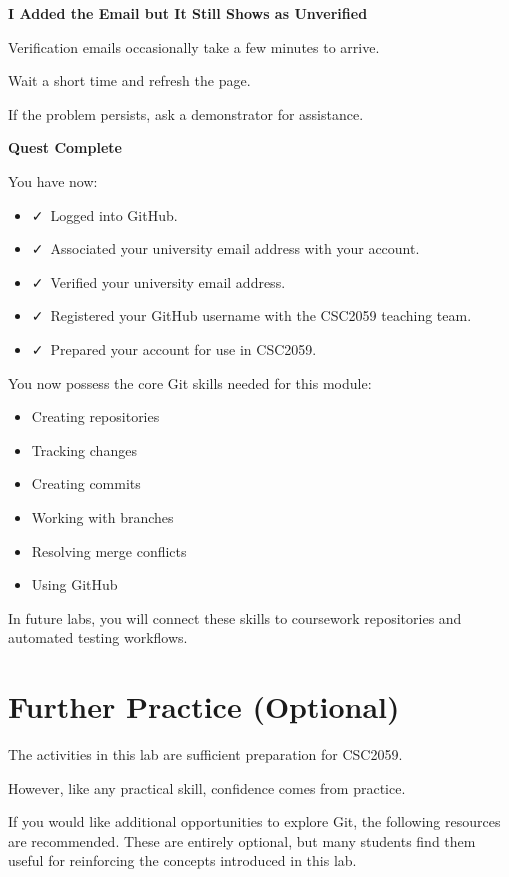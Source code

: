 \documentclass{csc2059practical}
\begin{document}
\begin{commonerror}
\textbf{I Added the Email but It Still Shows as Unverified}\par
\medskip
Verification emails occasionally take a few minutes to arrive.

Wait a short time and refresh the page.

If the problem persists, ask a demonstrator for assistance.
\end{commonerror}
\begin{wrapupbox}
\textbf{Quest Complete}\par
\medskip
You have now:

\begin{itemize}
  \item \faCheck\ Logged into GitHub.
  \item \faCheck\ Associated your university email address with your account.
  \item \faCheck\ Verified your university email address.
  \item \faCheck\ Registered your GitHub username with the CSC2059 teaching team.
  \item \faCheck\ Prepared your account for use in CSC2059.
\end{itemize}

You now possess the core Git skills needed for this module:

\begin{itemize}
  \item Creating repositories
  \item Tracking changes
  \item Creating commits
  \item Working with branches
  \item Resolving merge conflicts
  \item Using GitHub
\end{itemize}

In future labs, you will connect these skills to coursework repositories and automated testing workflows.
\end{wrapupbox}
\section{Further Practice (Optional)}
The activities in this lab are sufficient preparation for CSC2059.

However, like any practical skill, confidence comes from practice.

If you would like additional opportunities to explore Git, the following resources are recommended. These are entirely optional, but many students find them useful for reinforcing the concepts introduced in this lab.
\end{document}

